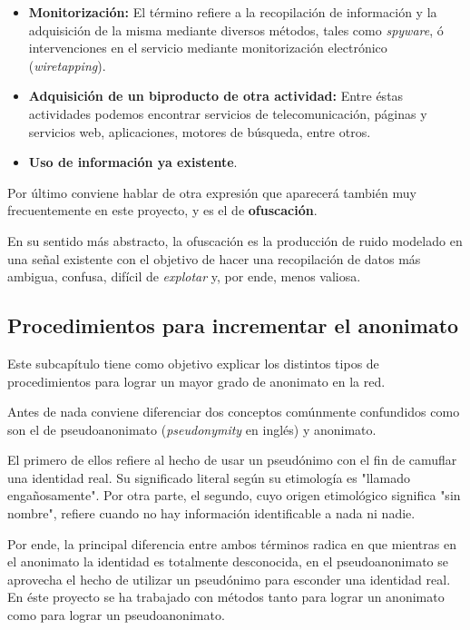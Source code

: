\begin{itemize}
	\item {\textbf{Monitorización:} El término refiere a la recopilación de información y la adquisición de la misma mediante diversos métodos, tales como \textit{spyware}, ó intervenciones en el servicio mediante monitorización electrónico (\textit{wiretapping}).}
	\item {\textbf{Adquisición de un biproducto de otra actividad:} Entre éstas actividades podemos encontrar servicios de telecomunicación, páginas y servicios web, aplicaciones, motores de búsqueda, entre otros.} 
	\item {\textbf{Uso de información ya existente}.}
\end{itemize} 

Por último conviene hablar de otra expresión que aparecerá también muy frecuentemente en este proyecto, y es el de \textbf{ofuscación}.

En su sentido más abstracto, la ofuscación es la producción de ruido modelado en una señal existente con el objetivo de hacer una recopilación de datos más ambigua, confusa, difícil de \textit{explotar} y, por ende, menos valiosa.

\subsection{Procedimientos para incrementar el anonimato}

Este subcapítulo tiene como objetivo explicar los distintos tipos de procedimientos para lograr un mayor grado de anonimato en la red. 

Antes de nada conviene diferenciar dos conceptos comúnmente confundidos como son el de pseudoanonimato (\textit{pseudonymity} en inglés) y anonimato. ~\cite{article:anopseudo}

El primero de ellos refiere al hecho de usar un pseudónimo con el fin de camuflar una identidad real. Su significado literal según su etimología es  "llamado engañosamente".
Por otra parte, el segundo, cuyo origen etimológico significa "sin nombre", refiere cuando no hay información identificable a nada ni nadie.

Por ende, la principal diferencia entre ambos términos radica en que mientras en el anonimato la identidad es totalmente desconocida, en el pseudoanonimato se aprovecha el hecho de utilizar un pseudónimo para esconder una identidad real. 
En éste proyecto se ha trabajado con métodos tanto para lograr un anonimato como para lograr un pseudoanonimato.

